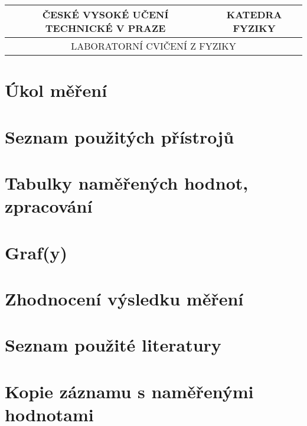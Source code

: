 \documentclass{article}
\begin{document}
    \begin{titlepage}
        \vfill
        \begin{tabular}{|c|c|c|c|}
            \hline
            ČESKÉ VYSOKÉ UČENÍ TECHNICKÉ V PRAZE & \multicolumn{3}{c|}{KATEDRA FYZIKY} \\ \hline
            \multicolumn{4}{|c|}{LABORATORNÍ CVIČENÍ Z FYZIKY} \\ \hline

        \end{tabular}
    \end{titlepage}
    \tableofcontents
    \newpage
    \section{Úkol měření}

    \section{Seznam použitých přístrojů}

    \section{Tabulky naměřených hodnot, zpracování}

    \section{Graf(y)}

    \section{Zhodnocení výsledku měření}

    \section{Seznam použité literatury}

    \section{Kopie záznamu s naměřenými hodnotami}
\end{document}
